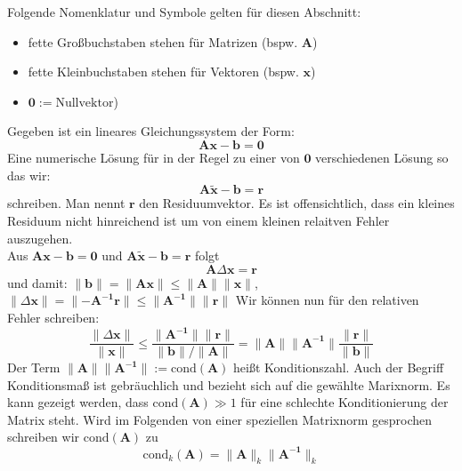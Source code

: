{
\small
Folgende Nomenklatur und Symbole gelten für diesen Abschnitt:
\begin{itemize}[itemsep=0mm]
	\item	fette Großbuchstaben stehen für Matrizen (bspw. $\mathbf{A}$)
	\item	fette Kleinbuchstaben stehen für Vektoren (bspw. $\mathbf{x}$)
	\item	$\mathbf{0} := \text{Nullvektor}$)
\end{itemize}
%
Gegeben ist ein lineares Gleichungssystem der Form:
$$ \mathbf{A}\mathbf{x}-\mathbf{b} =\mathbf{0} $$
Eine numerische Lösung für in der Regel zu einer von $\mathbf{0}$ verschiedenen Lösung so das wir:
$$ \mathbf{A}\mathbf{\tilde{x}}-\mathbf{b} =\mathbf{r} $$
schreiben. Man nennt $\mathbf{r}$ den Residuumvektor. Es ist offensichtlich, dass ein kleines Residuum nicht hinreichend ist um von einem kleinen relaitven Fehler auszugehen.\\
Aus $\mathbf{A}\mathbf{x}-\mathbf{b} =\mathbf{0}$ und $\mathbf{A}\mathbf{\tilde{x}}-\mathbf{b} =\mathbf{r}$ folgt $$ \mathbf{A}\Delta\mathbf{x}=\mathbf{r}$$
und damit:
$ 
\lVert \mathbf{b} \rVert=\lVert \mathbf{Ax} \rVert \leq \lVert \mathbf{A} \rVert \lVert \mathbf{x} \rVert
$, 
$
\lVert \Delta\mathbf{x} \rVert=\lVert -\mathbf{A^{-1}r} \rVert \leq \lVert \mathbf{A^{-1}} \rVert \lVert \mathbf{r} \rVert
$
Wir können nun für den relativen Fehler schreiben:
$$
\frac{\lVert \Delta\mathbf{x} \rVert}{\lVert \mathbf{x} \rVert} \leq 
\frac{\lVert \mathbf{A^{-1}} \rVert \lVert \mathbf{r} \rVert}{\lVert \mathbf{b} \rVert / \lVert \mathbf{A} \rVert} =
\lVert \mathbf{A} \rVert \lVert \mathbf{A^{-1}} \rVert \frac{\lVert \mathbf{r} \rVert}{\lVert \mathbf{b} \rVert}
$$
Der Term $\lVert \mathbf{A} \rVert \lVert \mathbf{A^{-1}} \rVert := \text{cond}(\mathbf{A})$ heißt Konditionszahl. Auch der Begriff Konditionsmaß ist gebräuchlich und bezieht sich auf die gewählte Marixnorm.
Es kann gezeigt werden, dass $\text{cond}(\mathbf{A}) \gg 1$  für eine schlechte Konditionierung der Matrix steht. Wird im Folgenden von einer speziellen Matrixnorm gesprochen schreiben wir $\text{cond}(\mathbf{A})$ zu 
$$ 
\text{cond}_k(\mathbf{A}) = \lVert \mathbf{A} \rVert_k \lVert \mathbf{A^{-1}} \rVert_k
$$ \\

}
